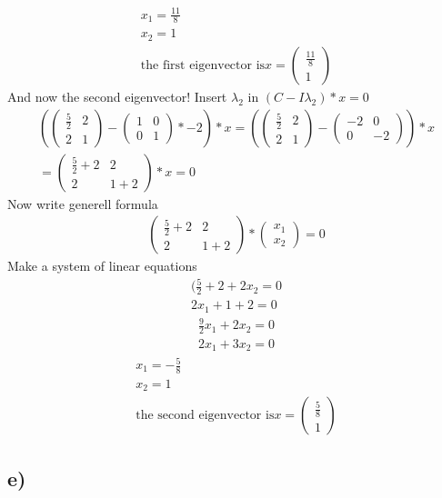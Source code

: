 \documentclass[12pt]{article}
\begin{document}
\begin{gather*}
    x_1 = \frac{11}{8}\\
    x_2 = 1 \\
    \text{the first eigenvector is} x = 
    \begin{pmatrix}
        \frac{11}{8} \\
        1 
   \end{pmatrix}
\end{gather*}
And now the second eigenvector!
Insert $\lambda_2$ in $(C - I\lambda_2) * x = 0 $
\begin{gather*}
    \left (
        \begin{pmatrix}
            \frac{5}{2} & 2 \\
            2 & 1 
    \end{pmatrix}
    -
   \begin{pmatrix}
       1 & 0 \\
            0 & 1 
    \end{pmatrix} 
    * -2  \right ) * x = 
    \left (
        \begin{pmatrix}
            \frac{5}{2} & 2 \\
            2 & 1 
    \end{pmatrix}
    -
   \begin{pmatrix}
       -2  & 0 \\
       0 & -2 
    \end{pmatrix} 
\right ) * x  \\
= \begin{pmatrix}
    \frac{5}{2} + 2  & 2 \\
    2 & 1 +2  
        \end{pmatrix} * x = 0 
\end{gather*}
Now  write generell formula
\begin{gather*}
 \begin{pmatrix}
     \frac{5}{2} +2 & 2 \\
     2 & 1 +2 
        \end{pmatrix}  
        *
        \begin{pmatrix}
            x_1 \\
            x_2
        \end{pmatrix}
        =
        0
\end{gather*}
Make a system of linear equations
\begin{align}
    (\frac{5}{2} + 2 + 2x_2 = 0  \\
    2x_1 +1 + 2 = 0 
\end{align}
\begin{align}
    \frac{9}{2}x_1 + 2x_2 = 0  \\
    2x_1 + 3x_2  = 0 
\end{align}
\begin{gather*}
    x_1 = -\frac{5}{8}\\
    x_2 = 1 \\
    \text{the second eigenvector is} x = 
    \begin{pmatrix}
        \frac{5}{8}\\
        1
   \end{pmatrix}
\end{gather*}

\subsection{e)}
\end{document}
